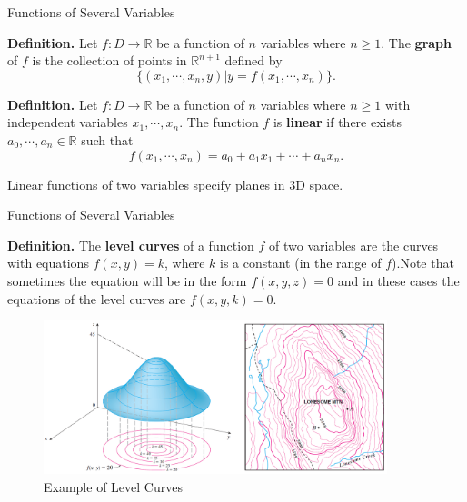 \documentclass[aspectratio=169, UTF8]{ctexbeamer}
\begin{document}
    \begin{frame}[t]{Functions of Several Variables}
        \begin{block}
            \par \textbf{Definition.} Let $f: D \to \mathbb{R}$ be a function of $n$ variables where $n \geq 1$. The \textbf{graph} of $f$ is the collection of points in $\mathbb{R}^{n+1}$ defined by 
            \begin{equation*}
                \{ (x_1, \cdots, x_n, y)| y = f(x_1, \cdots, x_n) \} .
            \end{equation*}
        \end{block}

        \begin{block}
            \par \textbf{Definition.} Let $f: D \to \mathbb{R}$ be a function of $n$ variables where $n \geq 1$ with independent variables $x_1, \cdots, x_n$. The function $f$ is \textbf{linear} if there exists $a_0, \cdots, a_n \in \mathbb{R}$ such that 
            \begin{equation*}
                f(x_1, \cdots, x_n) = a_0 + a_1 x_1 + \cdots + a_n x_n .
            \end{equation*}

            \par Linear functions of two variables specify planes in 3D space. 
        \end{block}
    \end{frame}

    \begin{frame}[t]{Functions of Several Variables}
        \begin{block}
            \par \textbf{Definition.} The \textbf{level curves} of a function $f$ of two variables are the curves with equations $f(x,y) = k$, where $k$ is a constant (in the range of $f$).Note that sometimes the equation will be in the form $f(x,y,z)=0$ and in these cases the equations of the level curves are $f(x,y,k)=0$.
        \end{block}
        
        \begin{figure}
            \centering 
            \includegraphics[width = 10cm]{f4}
            \caption{Example of Level Curves}
        \end{figure}
    \end{frame}
\end{document}
